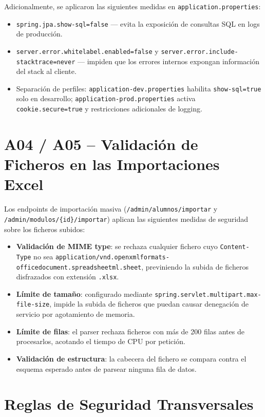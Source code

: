 \documentclass[12pt, a4paper]{report}
\begin{document}
Adicionalmente, se aplicaron las siguientes medidas en \texttt{application.properties}:

\begin{itemize}
  \item \texttt{spring.jpa.show-sql=false} --- evita la exposición de consultas SQL en logs de producción.
  \item \texttt{server.error.whitelabel.enabled=false} y \texttt{server.error.include-stacktrace=never} --- impiden que los errores internos expongan información del stack al cliente.
  \item Separación de perfiles: \texttt{application-dev.properties} habilita \texttt{show-sql=true} solo en desarrollo; \texttt{application-prod.properties} activa \texttt{cookie.secure=true} y restricciones adicionales de logging.
\end{itemize}

\section{A04 / A05 -- Validación de Ficheros en las Importaciones Excel}

Los endpoints de importación masiva (\texttt{/admin/alumnos/importar} y \texttt{/admin/modulos/\{id\}/importar}) aplican las siguientes medidas de seguridad sobre los ficheros subidos:

\begin{itemize}
  \item \textbf{Validación de MIME type}: se rechaza cualquier fichero cuyo \texttt{Content-Type} no sea \texttt{application/vnd.openxmlformats-officedocument.spreadsheetml.sheet}, previniendo la subida de ficheros disfrazados con extensión \texttt{.xlsx}.
  \item \textbf{Límite de tamaño}: configurado mediante \texttt{spring.servlet.multipart.max-file-size}, impide la subida de ficheros que puedan causar denegación de servicio por agotamiento de memoria.
  \item \textbf{Límite de filas}: el parser rechaza ficheros con más de 200 filas antes de procesarlos, acotando el tiempo de CPU por petición.
  \item \textbf{Validación de estructura}: la cabecera del fichero se compara contra el esquema esperado antes de parsear ninguna fila de datos.
\end{itemize}

\section{Reglas de Seguridad Transversales}
\end{document}
